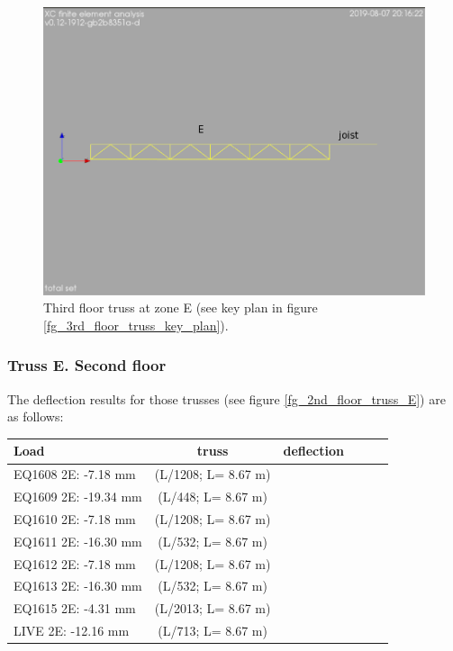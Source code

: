 \begin{figure}
  \begin{center}
  \includegraphics[width=120mm]{figures/floor_truss_E}
  \end{center}
  \caption{Third floor truss at zone E (see key plan in figure \ref{fg_3rd_floor_truss_key_plan}).}\label{fg_floor_truss_E}
\end{figure}

\subsubsection{Truss E. Second floor}
The deflection results for those trusses (see figure \ref{fg_2nd_floor_truss_E}) are as follows:

\begin{center}
  \begin{scriptsize}
  \begin{tabular}{|l|c|c|c|c|c|c|}
    \hline
    \textbf{Load} & \textbf{truss} & \multicolumn{2}{c|}{\textbf{deflection}} \\
    \hline
EQ1608 2E: -7.18  mm & (L/1208; L= 8.67 m)\\
EQ1609 2E: -19.34  mm & (L/448; L= 8.67 m)\\
EQ1610 2E: -7.18  mm & (L/1208; L= 8.67 m)\\
EQ1611 2E: -16.30  mm & (L/532; L= 8.67 m)\\
EQ1612 2E: -7.18  mm & (L/1208; L= 8.67 m)\\
EQ1613 2E: -16.30  mm & (L/532; L= 8.67 m)\\
EQ1615 2E: -4.31  mm & (L/2013; L= 8.67 m)\\
LIVE 2E: -12.16  mm & (L/713; L= 8.67 m)\\
\hline
  \end{tabular}
  \end{scriptsize}
\end{center}


